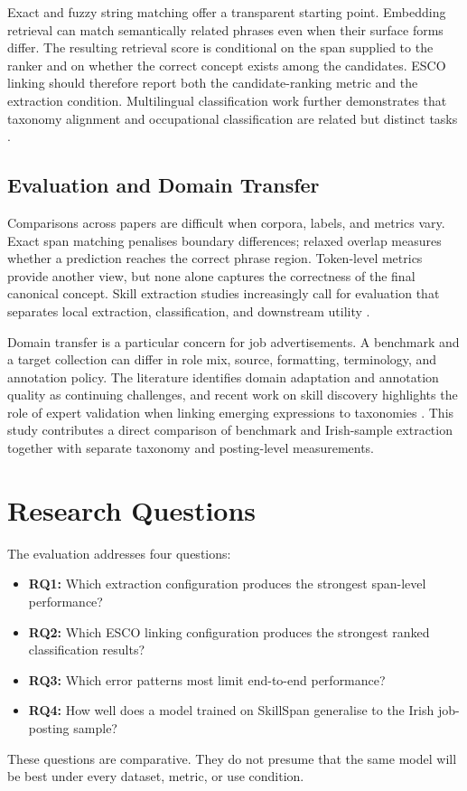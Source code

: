 \documentclass[conference]{IEEEtran}
\begin{document}
Exact and fuzzy string matching offer a transparent starting point. Embedding retrieval can match semantically related phrases even when their surface forms differ. The resulting retrieval score is conditional on the span supplied to the ranker and on whether the correct concept exists among the candidates. ESCO linking should therefore report both the candidate-ranking metric and the extraction condition. Multilingual classification work further demonstrates that taxonomy alignment and occupational classification are related but distinct tasks \cite{Kavas2024,Gnehm2025}.

\subsection{Evaluation and Domain Transfer}
Comparisons across papers are difficult when corpora, labels, and metrics vary. Exact span matching penalises boundary differences; relaxed overlap measures whether a prediction reaches the correct phrase region. Token-level metrics provide another view, but none alone captures the correctness of the final canonical concept. Skill extraction studies increasingly call for evaluation that separates local extraction, classification, and downstream utility \cite{Senger2024,SkillSpan2022}.

Domain transfer is a particular concern for job advertisements. A benchmark and a target collection can differ in role mix, source, formatting, terminology, and annotation policy. The literature identifies domain adaptation and annotation quality as continuing challenges, and recent work on skill discovery highlights the role of expert validation when linking emerging expressions to taxonomies \cite{Napierala2024,DeSanto2026,Panzaru2025}. This study contributes a direct comparison of benchmark and Irish-sample extraction together with separate taxonomy and posting-level measurements.

\section{Research Questions}
The evaluation addresses four questions:
\begin{itemize}
  \item \textbf{RQ1:} Which extraction configuration produces the strongest span-level performance?
  \item \textbf{RQ2:} Which ESCO linking configuration produces the strongest ranked classification results?
  \item \textbf{RQ3:} Which error patterns most limit end-to-end performance?
  \item \textbf{RQ4:} How well does a model trained on SkillSpan generalise to the Irish job-posting sample?
\end{itemize}
These questions are comparative. They do not presume that the same model will be best under every dataset, metric, or use condition.
\end{document}
